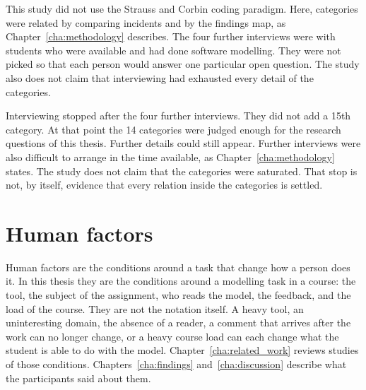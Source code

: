 This study did not use the Strauss and Corbin coding paradigm. Here, categories were related by comparing incidents and by the findings map, as Chapter~\ref{cha:methodology} describes. The four further interviews were with students who were available and had done software modelling. They were not picked so that each person would answer one particular open question. The study also does not claim that interviewing had exhausted every detail of the categories.

Interviewing stopped after the four further interviews. They did not add a 15th category. At that point the 14 categories were judged enough for the research questions of this thesis. Further details could still appear. Further interviews were also difficult to arrange in the time available, as Chapter~\ref{cha:methodology} states. The study does not claim that the categories were saturated. That stop is not, by itself, evidence that every relation inside the categories is settled.

\section{Human factors}
\label{sec:human_factors}

Human factors are the conditions around a task that change how a person does it. In this thesis they are the conditions around a modelling task in a course: the tool, the subject of the assignment, who reads the model, the feedback, and the load of the course. They are not the notation itself. A heavy tool, an uninteresting domain, the absence of a reader, a comment that arrives after the work can no longer change, or a heavy course load can each change what the student is able to do with the model. Chapter~\ref{cha:related_work} reviews studies of those conditions. Chapters~\ref{cha:findings} and~\ref{cha:discussion} describe what the participants said about them.
